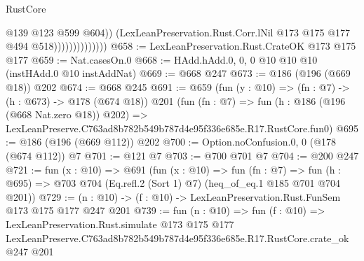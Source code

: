 \begin{lexlean}{RustCore}
\begin{coremodule}
                                  @139
                                  @123
                                  @599
                                  @604))
                              (LexLeanPreservation.Rust.Corr.lNil
                                @173
                                @175
                                @177
                                @494
                                @518))))))))))))))
@658 := LexLeanPreservation.Rust.CrateOK @173 @175 @177
@659 := Nat.casesOn.{0}
@668 := HAdd.hAdd.{0, 0, 0} @10 @10 @10 (instHAdd.{0} @10 instAddNat)
@669 := @668 @247
@673 := @186 (@196 (@669 @18)) @202
@674 := @668 @245
@691 := @659
    (fun (y : @10) => (fn : @7) -> (h : @673) -> @178 (@674 @18))
    @201
    (fun (fn : @7) =>
    fun (h : @186 (@196 (@668 Nat.zero @18)) @202) =>
    LexLeanPreserve.C763ad8b782b549b787d4e95f336e685e.R17.RustCore.fun0)
@695 := @186 (@196 (@669 @112)) @202
@700 := Option.noConfusion.{0, 0} (@178 (@674 @112)) @7
@701 := @121 @7
@703 := @700 @701 @7
@704 := @200 @247
@721 := fun (x : @10) =>
  @691
    (fun (x : @10) =>
    fun (fn : @7) =>
    fun (h : @695) => @703 @704 (Eq.refl.{2} (Sort 1) @7) (heq_of_eq.{1} @185 @701 @704 @201))
@729 := (n : @10) -> (f : @10) -> LexLeanPreservation.Rust.FunSem @173 @175 @177 @247 @201
@739 := fun (n : @10) =>
  fun (f : @10) =>
  LexLeanPreservation.Rust.simulate
    @173
    @175
    @177
    LexLeanPreserve.C763ad8b782b549b787d4e95f336e685e.R17.RustCore.crate_ok
    @247
    @201
\end{coremodule}
\end{lexlean}
